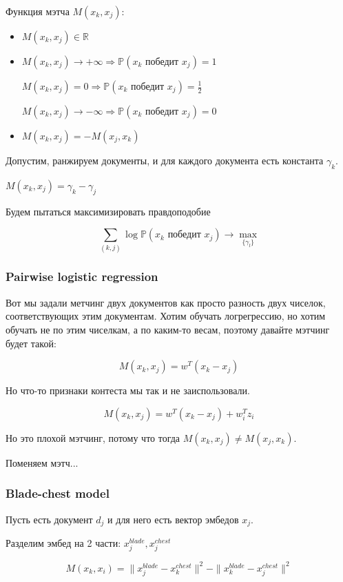 \documentclass[a4paper]{article}
\begin{document}
Функция мэтча $M(x_k, x_j)$:
\begin{itemize}
\item $M(x_k, x_j) \in \mathbb{R}$
\item $M(x_k, x_j) \rightarrow +\infty \Rightarrow \mathbb{P} (x_k \text{  победит  } x_j) = 1$

$M(x_k, x_j) = 0 \Rightarrow \mathbb{P} (x_k \text{  победит  } x_j) = \frac{1}{2}$

$M(x_k, x_j) \rightarrow -\infty \Rightarrow \mathbb{P} (x_k \text{  победит  } x_j) = 0$
\item $M(x_k, x_j) = -M(x_j, x_k)$
\end{itemize}

Допустим, ранжируем документы, и для каждого документа есть константа $\gamma_k$.

$M(x_k, x_j) = \gamma_k - \gamma_j$

Будем пытаться максимизировать правдоподобие 

\[ \sum_{(k, j)} \log \mathbb{P} (x_k \text{  победит  } x_j) \rightarrow \max_{\{\gamma_l\}} \]

\subsubsection*{Pairwise logistic regression}

Вот мы задали метчинг двух документов как просто разность двух чиселок, соответствующих этим документам. Хотим обучать логрегрессию, но хотим обучать не по этим чиселкам, а по каким-то весам, поэтому давайте мэтчинг будет такой:

\[ M(x_k, x_j) = w^T (x_k - x_j) \]

Но что-то признаки контеста мы так и не заиспользовали.


\[ M(x_k, x_j) = w^T (x_k - x_j) + w_i^Tz_i \]

Но это плохой мэтчинг, потому что тогда $M(x_k, x_j) \neq M(x_j, x_k)$.

Поменяем мэтч...

\subsubsection*{Blade-chest model}

Пусть есть документ $d_j$ и для него есть вектор эмбедов $x_j$.

Разделим эмбед на 2 части: $x_j^{blade}, x_j^{chest}$

\[ M(x_k, x_i) = \|x_j^{blade} - x_k^{chest}\|^2 - \|x_k^{blade} - x_j^{chest}\|^2 \]
\end{document}
